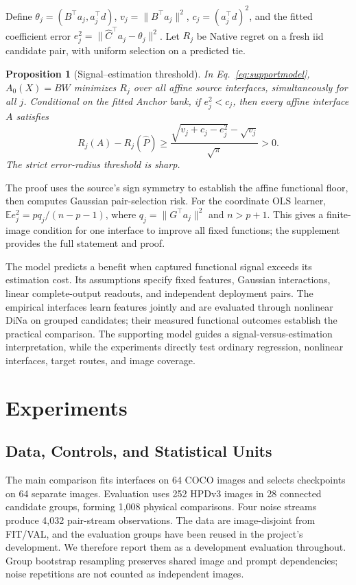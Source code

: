 \documentclass[10pt,twocolumn,letterpaper]{article}
\newtheorem{proposition}{Proposition}
\newcommand{\E}{\mathbb E}
\begin{document}
Define $\theta_j=(B^\top a_j,a_j^\top d)$, $v_j=\|B^\top a_j\|^2$, $c_j=(a_j^\top d)^2$, and the fitted coefficient error $e_j^2=\|\widehat C^\top a_j-\theta_j\|^2$. Let $R_j$ be Native regret on a fresh iid candidate pair, with uniform selection on a predicted tie.
\begin{proposition}[Signal--estimation threshold]
\label{prop:signal}
In Eq.~\eqref{eq:supportmodel}, $A_0(X)=BW$ minimizes $R_j$ over all affine source interfaces, simultaneously for all $j$. Conditional on the fitted Anchor bank, if $e_j^2<c_j$, then every affine interface $A$ satisfies
\begin{equation}
 R_j(A)-R_j(\widehat P)\ge
 \frac{\sqrt{v_j+c_j-e_j^2}-\sqrt{v_j}}{\sqrt\pi}>0.
 \label{eq:signal}
\end{equation}
The strict error-radius threshold is sharp.
\end{proposition}
The proof uses the source's sign symmetry to establish the affine functional floor, then computes Gaussian pair-selection risk. For the coordinate OLS learner, $\E e_j^2=pq_j/(n-p-1)$, where $q_j=\|G^\top a_j\|^2$ and $n>p+1$. This gives a finite-image condition for one interface to improve all fixed functions; the supplement provides the full statement and proof.

The model predicts a benefit when captured functional signal exceeds its estimation cost. Its assumptions specify fixed features, Gaussian interactions, linear complete-output readouts, and independent deployment pairs. The empirical interfaces learn features jointly and are evaluated through nonlinear DiNa on grouped candidates; their measured functional outcomes establish the practical comparison. The supporting model guides a signal-versus-estimation interpretation, while the experiments directly test ordinary regression, nonlinear interfaces, target routes, and image coverage.

\section{Experiments}
\label{sec:experiments}
\subsection{Data, Controls, and Statistical Units}
The main comparison fits interfaces on 64 COCO images and selects checkpoints on 64 separate images. Evaluation uses 252 HPDv3 images in 28 connected candidate groups, forming 1,008 physical comparisons. Four noise streams produce 4,032 pair-stream observations. The data are image-disjoint from FIT/VAL, and the evaluation groups have been reused in the project's development. We therefore report them as a development evaluation throughout. Group bootstrap resampling preserves shared image and prompt dependencies; noise repetitions are not counted as independent images.
\end{document}
